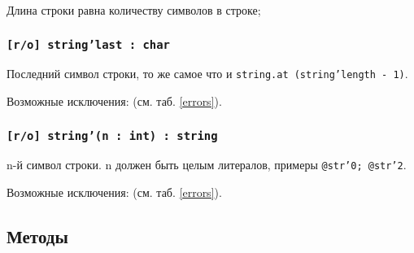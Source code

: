 Длина строки равна количеству символов в строке;

\subsubsection{\texttt{[r/o] string'last : char}}

Последний символ строки, то же самое что и \texttt{string.at (string'length - 1)}.

Возможные исключения:  (см. таб. \ref{errors}).

\subsubsection{\texttt{[r/o] string'(n : int) : string}}

n-й символ строки. n должен быть целым литералов, примеры \texttt{@str'0; @str'2}.

Возможные исключения:  (см. таб. \ref{errors}).

\subsection{Методы}

